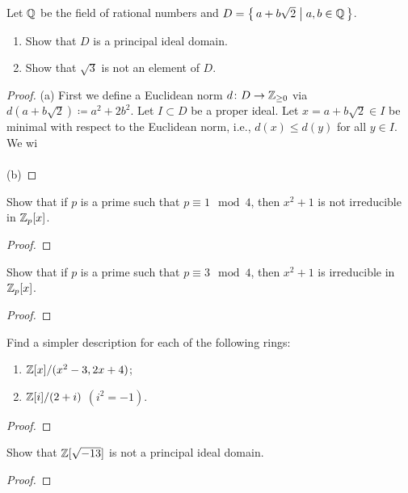 \begin{problem}
Let $\mathbb{Q}$ be the field of rational numbers and
$D=\left\{\,a+b\sqrt{2}\;\middle|\;a,b\in\mathbb{Q}\,\right\}$.
\begin{enumerate}[label=(\alph*)]
\item Show that $D$ is a principal ideal domain.
\item Show that $\sqrt{3}$ is not an element of $D$.
\end{enumerate}
\end{problem}
\begin{proof}
(a) First we define a Euclidean norm $d\colon D\to\mathbb{Z}_{\geq 0}$ via
$d\left(a+b\sqrt{2}\right)\coloneqq a^2+2b^2$. Let $I\subset D$ be a proper
ideal. Let $x=a+b\sqrt{2}\in I$ be minimal with respect to the Euclidean
norm, i.e., $d(x)\leq d(y)$ for all $y\in I$. We wi
\\\\
(b)
\end{proof}

\begin{problem}
Show that if $p$ is a prime such that $p\equiv 1\mod 4$, then $x^2+1$ is
not irreducible in $\mathbb{Z}_p[x]$.
\end{problem}
\begin{proof}
\end{proof}

\begin{problem}
Show that if $p$ is a prime such that $p\equiv 3\mod 4$, then $x^2+1$ is
irreducible in $\mathbb{Z}_p[x]$.
\end{problem}
\begin{proof}
\end{proof}

\begin{problem}
Find a simpler description for each of the following rings:
\begin{enumerate}
\item $\mathbb{Z}[x]/(x^2-3,2x+4)$;
\item $\mathbb{Z}[i]/(2+i)$ $(i^2=-1)$.
\end{enumerate}
\end{problem}
\begin{proof}
\end{proof}

\begin{problem}
Show that $\mathbb{Z}[\sqrt{-13}]$ is not a principal ideal domain.
\end{problem}
\begin{proof}
\end{proof}

